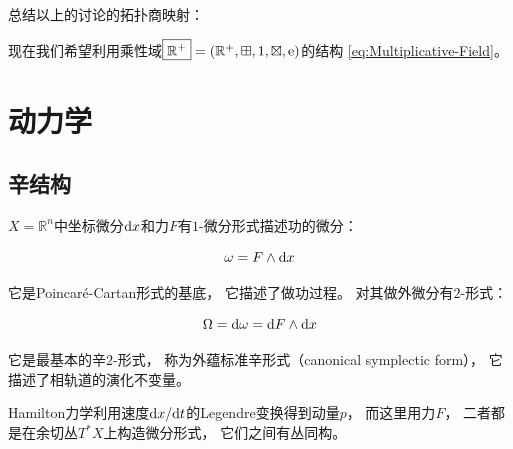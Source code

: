 ﻿\documentclass[10pt,a4paper]{article}
\numberwithin{equation}{section}
\newcommand{\sqplus}{\mathbin{\boxplus}}
\newcommand{\sqtimes}{\mathbin{\boxtimes}}
\begin{document}
总结以上的讨论的拓扑商映射：


现在我们希望利用乘性域$\boxed{\mathbb R^+} = (\mathbb R^+,\sqplus,1,\sqtimes,\text e)$的结构
\eqref{eq:Multiplicative-Field}。


\section{动力学}

\subsection{辛结构}

$X = \mathbb R^n$中坐标微分$\text dx$和力$F$有$1$-微分形式描述功的微分：

\begin{equation}
\omega = F \wedge \text dx
\label{eq:power-1-form}
\end{equation}

它是Poincaré-Cartan形式的基底，
它描述了做功过程。
对其做外微分有$2$-形式：

\begin{equation}
\Omega = \text d \omega = \text d F \wedge \text dx
\label{eq:canonical-symplectic-2-form}
\end{equation}

它是最基本的辛$2$-形式，
称为外蕴标准辛形式（canonical symplectic form），
它描述了相轨道的演化不变量。

Hamilton力学利用速度$\text dx / \text dt$的Legendre变换得到动量$p$，
而这里用力$F$，
二者都是在余切丛$T^*X$上构造微分形式，
它们之间有丛同构。
\end{document}
